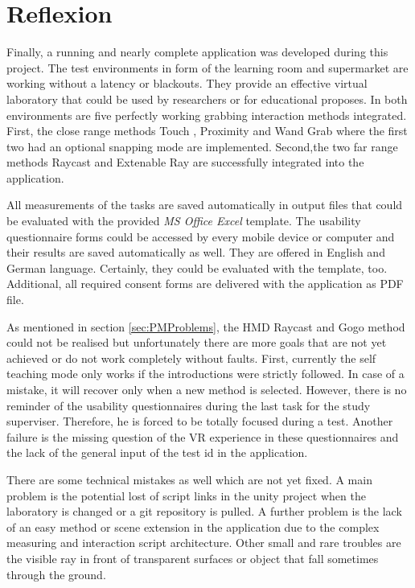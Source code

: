 \section{Reflexion} \label{sec:Reflexion}

Finally, a running and nearly complete application was developed during this project.
The test environments in form of the learning room and supermarket are working without a latency or blackouts. They provide an effective virtual laboratory that could be used by researchers or for educational proposes. In both environments are five perfectly working grabbing interaction methods integrated. First, the close range methods Touch , Proximity and Wand Grab where the first two had an optional snapping mode are implemented. Second,the two far range methods Raycast and Extenable Ray are successfully integrated into the application.
 
All measurements of the tasks are saved automatically in output files that could be evaluated with the provided \textit{MS Office Excel} template. 
The usability questionnaire forms could be accessed by every mobile device or computer and their results are saved automatically as well. They are offered in English and German language. Certainly, they could be evaluated with the template, too. Additional, all required consent forms are delivered with the application as PDF file.

As mentioned in section \ref{sec:PMProblems}, the HMD Raycast and Gogo method could not be realised but unfortunately there are more goals that are not yet achieved or do not work completely without faults. First, currently the self teaching mode only works if the introductions were strictly followed. In case of a mistake, it will recover only when a new method is selected. However, there is no reminder of the usability questionnaires during the last task for the study superviser. Therefore, he is forced to be totally focused during a test. Another failure is the missing question of the VR experience in  these questionnaires and the lack of the general input of the test id in the application.

There are some technical mistakes as well which are not yet fixed. A main problem is the potential lost of script links in the unity project when the laboratory is changed or a git repository is pulled. A further problem is the lack of an easy method or scene extension in the application due to the complex measuring and interaction script architecture. Other small and rare troubles are the visible ray in front of transparent surfaces or object that fall sometimes through the ground.

\newpage

























